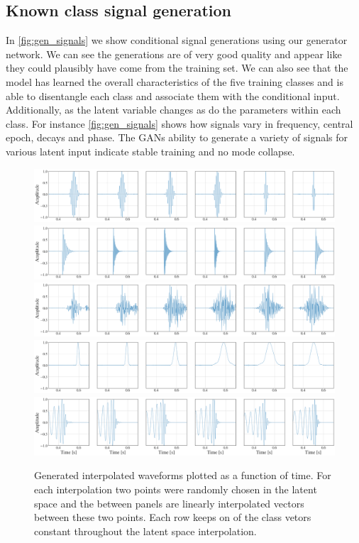 \documentclass[12pt]{iopart}
\begin{document}
\subsection{Known class signal generation}
In \cref{fig:gen_signals} we show conditional signal generations using our generator network. We can see the generations are of very good quality and appear like they could plausibly have come from the training set. We can also see that the model has learned the overall characteristics of the five training classes and is able to disentangle each class and associate them with the conditional input. Additionally, as the latent variable changes as do the parameters within each class. For instance \cref{fig:gen_signals} shows how signals vary in frequency, central epoch, decays and phase. The GANs ability to generate a variety of signals for various latent input indicate stable training and no mode collapse. 
\begin{figure}[!h]
    \centering
    \includegraphics[width=\textwidth]{figures/generations/z_interp_sg.png}
    \includegraphics[width=\textwidth]{figures/generations/z_interp_rd.png}
    \includegraphics[width=\textwidth]{figures/generations/z_interp_wnb.png}
    \includegraphics[width=\textwidth]{figures/generations/z_interp_blip.png}
    \includegraphics[width=\textwidth]{figures/generations/z_interp_bbh.png}
    \caption{Generated interpolated waveforms plotted as a function of time. For each interpolation two points were randomly chosen in the latent space and the between panels are linearly interpolated vectors between these two points. Each row keeps on of the class vetors constant throughout the latent space interpolation.}
    \label{fig:z_interp}
\end{figure}
\end{document}
